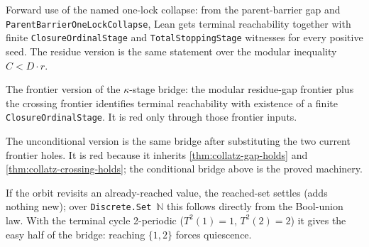 \begin{theorem}
  \label{thm:collatz-parent-one-lock-kappa-package-forward}
  \leanok
  Forward use of the named one-lock collapse: from the parent-barrier gap and
  \texttt{ParentBarrierOneLockCollapse}, Lean gets terminal reachability together
  with finite \texttt{ClosureOrdinalStage} and \texttt{TotalStoppingStage}
  witnesses for every positive seed. The residue version is the same statement
  over the modular inequality \(C<D\cdot r\).
\end{theorem}

\begin{theorem}
  \label{thm:collatz-residue-frontier-kappa-stage}
  \notready
  The frontier version of the \(\kappa\)-stage bridge: the modular
  residue-gap frontier plus the crossing frontier identifies terminal reachability
  with existence of a finite \texttt{ClosureOrdinalStage}. It is red only through
  those frontier inputs.
\end{theorem}

\begin{theorem}
  \label{thm:collatz-unconditional-kappa-stopping-time}
  \notready
  The unconditional version is the same bridge after substituting the two current frontier
  holes. It is red because it inherits \cref{thm:collatz-gap-holds} and
  \cref{thm:collatz-crossing-holds}; the conditional bridge above is the proved machinery.
\end{theorem}

\begin{theorem}
  \label{thm:collatz-quiesce-of-terminal}
  \leanok
  If the orbit revisits an already-reached value, the reached-set settles (adds
  nothing new); over \texttt{Discrete.Set}~$\mathbb{N}$ this follows directly from
  the Bool-union law. With the terminal cycle 2-periodic ($T^2(1)=1$,
  $T^2(2)=2$) it gives the easy half of the bridge: reaching $\{1,2\}$ forces
  quiescence.
\end{theorem}
